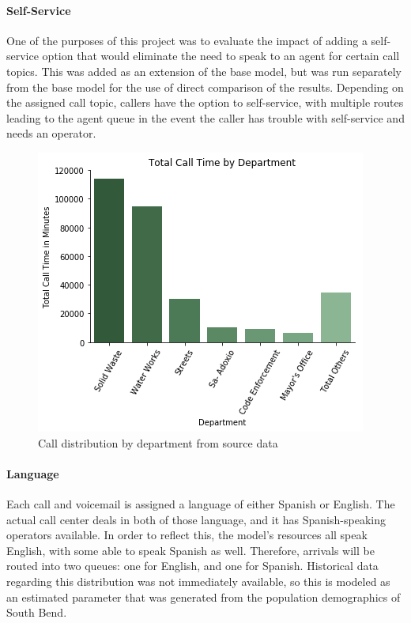 \documentclass[12pt]{article}
\begin{document}
	\paragraph{Self-Service}
	
One of the purposes of this project was to evaluate the impact of adding a self-service option that would eliminate the need to speak to an agent for certain call topics.  This was added as an extension of the base model, but was run separately from the base model for the use of direct comparison of the results.  Depending on the assigned call topic, callers have the option to self-service, with multiple routes leading to the agent queue in the event the caller has trouble with self-service and needs an operator.


\begin{figure}[h]
	\includegraphics[scale=.53]{Calls_Department_sim.png}
	\caption{Call distribution by department from source data}
\end{figure}

	\paragraph{Language}

Each call and voicemail is assigned a language of either Spanish or English.  The actual call center deals in both of those language, and it has Spanish-speaking operators available.  In order to reflect this, the model's resources all speak English, with some able to speak Spanish as well.  Therefore, arrivals will be routed into two queues:  one for English, and one for Spanish.  Historical data regarding this distribution was not immediately available, so this is modeled as an estimated parameter that was generated from the population demographics of South Bend.
\end{document}
